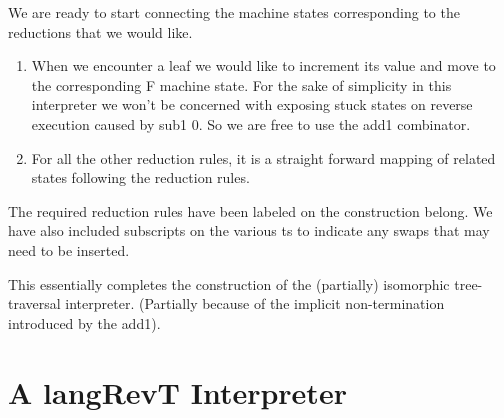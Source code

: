 \documentclass{llncs}
\begin{document}
We are ready to start connecting the machine states corresponding to
the reductions that we would like. 

\begin{enumerate}

\item 
When we encounter a leaf we would like to increment its value and move
to the corresponding {{F}} machine state. For the sake of simplicity
in this interpreter we won't be concerned with exposing stuck states
on reverse execution caused by {{sub1 0}}. So we are free to use the
{{add1}} combinator.

\item
For all the other reduction rules, it is a straight forward mapping of
related states following the reduction rules. 

\end{enumerate}

The required reduction rules have been labeled on the construction
belong. We have also included subscripts on the various {{t}}s to
indicate any swaps that may need to be inserted.

\begin{center}
\end{center}

This essentially completes the construction of the (partially)
isomorphic tree-traversal interpreter. (Partially because of the
implicit non-termination introduced by the {{add1}}).


\section{A {{langRevT}} Interpreter}
\end{document}
